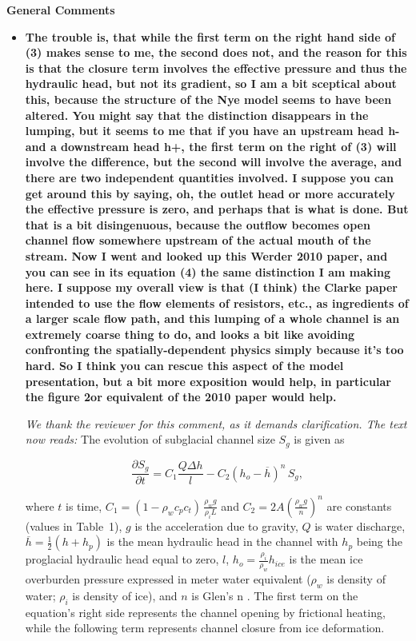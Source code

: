 \documentclass[11pt]{article}
\title{}
\author{}
\begin{document}
\textbf{General Comments}

\begin{itemize}

\item \textbf{
    The trouble is, that while the first term on the right hand side of (3) makes sense to me, the second does not, and the reason for this is that the closure term involves the effective pressure and thus the hydraulic head, but not its gradient, so I am a bit sceptical about this, because the structure of the Nye model seems to have been altered.
    You might say that the distinction disappears in the lumping, but it seems to me that if you have an upstream head h- and a downstream head h+, the first term on the right of (3) will involve the difference, but the second will involve the average, and there are two independent quantities involved.
    I suppose you can get around this by saying, oh, the outlet head or more accurately the effective pressure is zero, and perhaps that is what is done.
    But that is a bit disingenuous, because the outflow becomes open channel flow somewhere upstream of the actual mouth of the stream.
    Now I went and looked up this Werder 2010 paper, and you can see in its equation (4) the same distinction I am making here.
    I suppose my overall view is that (I think) the Clarke paper intended to use the flow elements of resistors, etc., as ingredients of a larger scale flow path, and this lumping of a whole channel is an extremely coarse thing to do, and looks a bit like avoiding confronting the spatially-dependent physics simply because it’s too hard.
    So I think you can rescue this aspect of the model presentation, but a bit more exposition would help, in particular the figure 2or equivalent of the 2010 paper would help.}


  \textit{We thank the reviewer for this comment, as it demands clarification. The text now reads:}
  The evolution of subglacial channel size $S_g$ is given as
  \begin{linenomath*}
    \begin{equation}
      \label{eq:dS_dt}
      \frac{\partial S_g}{\partial t} = C_1 \frac{Q \Delta h}{l} - C_2 \left(h_{o}-\overline{h}\right)^n\,S_g,
    \end{equation}
  \end{linenomath*}
  \noindent where $t$ is time, $C_1= (1-\rho_wc_pc_t)\,\frac{\rho_wg}{\rho_iL}$ and $C_2=2A(\frac{\rho_wg}{n})^n$ are constants (values in Table~1), $g$ is the acceleration due to gravity, $Q$ is water discharge, $\overline{h}=\frac{1}{2}(h+h_p)$ is the mean hydraulic head in the channel with $h_p$ being the proglacial hydraulic head equal to zero, $l$, $h_{o}= \frac{\rho_i}{\rho_w} h_{ice}$ is the mean ice overburden pressure expressed in meter water equivalent ($\rho_w$ is density of water; $\rho_i$ is density of ice), and $n$ is Glen's n \citep[usually $n=3$; ][]{glen1955}.
  The first term on the equation's right side represents the channel opening by frictional heating, while the following term represents channel closure from ice deformation.



\end{itemize}
\end{document}
